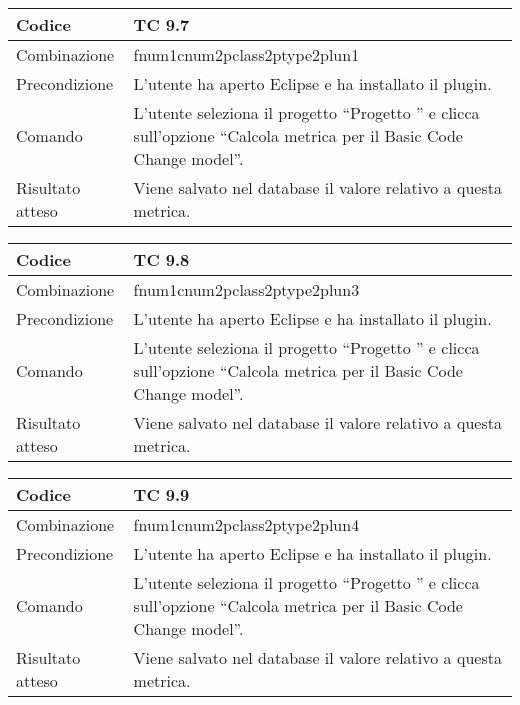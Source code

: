 \begin{table}[ht]
\begin{tabular}{|p{3cm}|p{9cm}|}
\hline
\cellcolor{lightgray}Codice				& TC 9.7								\\
\hline
\cellcolor{lightgray}Combinazione		& fnum1cnum2pclass2ptype2plun1									\\
\hline
\cellcolor{lightgray}Precondizione		& L'utente ha aperto Eclipse e ha installato il plugin.		\\
\hline
\cellcolor{lightgray}Comando			& L'utente seleziona il progetto ``Progetto ''  e clicca sull'opzione ``Calcola metrica per il Basic Code Change model''.	\\
\hline
\cellcolor{lightgray}Risultato atteso	& Viene salvato nel database il valore relativo a questa metrica.\\
\hline
\end{tabular}
\end{table}

\begin{table}[ht]
\begin{tabular}{|p{3cm}|p{9cm}|}
\hline
\cellcolor{lightgray}Codice				& TC 9.8								\\
\hline
\cellcolor{lightgray}Combinazione		& fnum1cnum2pclass2ptype2plun3									\\
\hline
\cellcolor{lightgray}Precondizione		& L'utente ha aperto Eclipse e ha installato il plugin.		\\
\hline
\cellcolor{lightgray}Comando			& L'utente seleziona il progetto ``Progetto ''  e clicca sull'opzione ``Calcola metrica per il Basic Code Change model''.	\\
\hline
\cellcolor{lightgray}Risultato atteso	& Viene salvato nel database il valore relativo a questa metrica.\\
\hline
\end{tabular}
\end{table}

\begin{table}[ht]
\begin{tabular}{|p{3cm}|p{9cm}|}
\hline
\cellcolor{lightgray}Codice				& TC 9.9								\\
\hline
\cellcolor{lightgray}Combinazione		& fnum1cnum2pclass2ptype2plun4									\\
\hline
\cellcolor{lightgray}Precondizione		& L'utente ha aperto Eclipse e ha installato il plugin.		\\
\hline
\cellcolor{lightgray}Comando			& L'utente seleziona il progetto ``Progetto ''  e clicca sull'opzione ``Calcola metrica per il Basic Code Change model''.	\\
\hline
\cellcolor{lightgray}Risultato atteso	& Viene salvato nel database il valore relativo a questa metrica.\\
\hline
\end{tabular}
\end{table}

